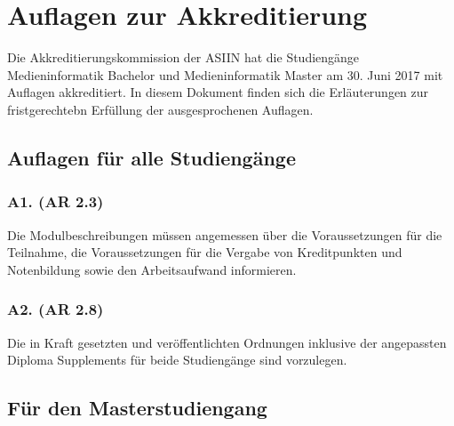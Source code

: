 \chapter{Auflagen zur
Akkreditierung\label{/mi-2017/selbstbericht/auflagen/0000-auflagen}}\label{auflagen-zur-akkreditierungpathlabelmi-2017selbstberichtauflagen0000-auflagen}

Die Akkreditierungskommission der ASIIN hat die Studiengänge
Medieninformatik Bachelor und Medieninformatik Master am 30. Juni 2017
mit Auflagen akkreditiert. In diesem Dokument finden sich die
Erläuterungen zur fristgerechtebn Erfüllung der ausgesprochenen
Auflagen.

\section{Auflagen für alle
Studiengänge\label{/mi-2017/selbstbericht/auflagen/0000-auflagen}}\label{auflagen-fuxfcr-alle-studienguxe4ngepathlabelmi-2017selbstberichtauflagen0000-auflagen}

\subsection{A1. (AR
2.3)\label{/mi-2017/selbstbericht/auflagen/0000-auflagen}}\label{a1.-ar-2.3pathlabelmi-2017selbstberichtauflagen0000-auflagen}

\begin{siderules}
Die Modulbeschreibungen müssen angemessen über die Voraussetzungen für
die Teilnahme, die Voraussetzungen für die Vergabe von Kreditpunkten und
Notenbildung sowie den Arbeitsaufwand informieren.
\end{siderules}

\subsection{A2. (AR 2.8)
\label{/mi-2017/selbstbericht/auflagen/0000-auflagen}}\label{a2.-ar-2.8-pathlabelmi-2017selbstberichtauflagen0000-auflagen}

Die in Kraft gesetzten und veröffentlichten Ordnungen inklusive der
angepassten Diploma Supplements für beide Studiengänge sind vorzulegen.

\section{Für den
Masterstudiengang\label{/mi-2017/selbstbericht/auflagen/0000-auflagen}}\label{fuxfcr-den-masterstudiengangpathlabelmi-2017selbstberichtauflagen0000-auflagen}

